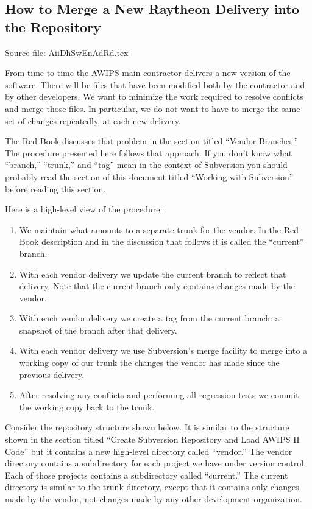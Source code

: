 
\subsection{How to Merge a New Raytheon Delivery into the Repository}

Source file: AiiDhSwEnAdRd.tex

From time to time the AWIPS main contractor delivers a
new version of the software.
There will be files that have been modified both by the
contractor and by other developers.  We want to minimize the
work required to resolve conflicts and merge those files.
In particular, we do not want to have to merge the same set
of changes repeatedly, at each new delivery.

The Red Book discusses that problem in the section titled
``Vendor Branches.''  The procedure presented here follows that 
approach.  If you don't know what ``branch,'' ``trunk,'' and ``tag''
mean in the context of Subversion you should probably read 
the section of this document titled ``Working with Subversion''
before reading this section.

Here is a high-level view of the procedure:
\begin{enumerate}
\item
We maintain what amounts to a separate trunk for the
vendor.  In the Red Book description and in the discussion
that follows it is called the ``current'' branch.
\item
With each vendor delivery we update the current branch to 
reflect that delivery.  Note that the current branch only
contains changes made by the vendor.
\item
With each vendor delivery we create a tag from the current
branch: a snapshot of the branch after that delivery.
\item
With each vendor delivery we use Subversion's merge facility
to merge into a working copy of our trunk the changes the 
vendor has made since the previous delivery.
\item
After resolving any conflicts and performing all regression
tests we commit the working copy back to the trunk.  
\end{enumerate}

Consider the repository structure shown below.  It is
similar to the structure shown in the section titled
``Create Subversion Repository and Load AWIPS II Code''
but it contains a new high-level directory called
``vendor.''  The vendor directory contains a subdirectory
for each project we have under version control.  Each of
those projects contains a subdirectory called ``current.''
The current directory is similar to the trunk directory,
except that it contains only changes made by the vendor, not
changes made by any other development organization.

